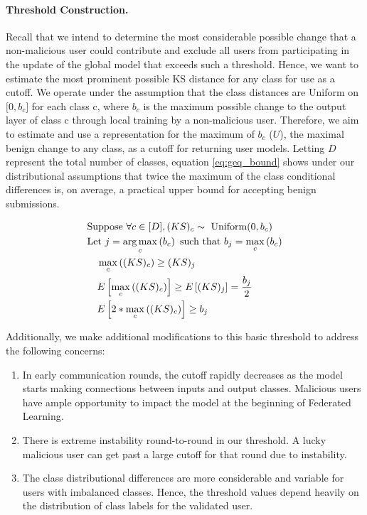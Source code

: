\documentclass{article} %
\begin{document}
\paragraph{Threshold Construction.} Recall that we intend to determine the most considerable possible change that a non-malicious user could contribute and exclude all users from participating in the update of the global model that exceeds such a threshold. Hence, we want to estimate the most prominent possible KS distance for any class for use as a cutoff. We operate under the assumption that the class distances are Uniform on $\mathopen[0, b_c\mathclose]$ for each class c, where $b_c$ is the maximum possible change to the output layer of class c through local training by a non-malicious user. Therefore, we aim to estimate and use a representation for the maximum of $b_c$ ($U$), the maximal benign change to any class, as a cutoff for returning user models. Letting $D$ represent the total number of classes, equation \ref{eq:geq_bound} shows under our distributional assumptions that twice the maximum of the class conditional differences is, on average, a practical upper bound for accepting benign submissions.

\begin{align}
    & \textrm{Suppose } \forall c \in \mathopen[ D \mathclose], (KS)_c \sim \textrm{ Uniform}(0, b_c) \nonumber \\
    & \textrm{Let } j = \operatorname*{arg\,max}_c \left( b_c \right) \textrm{ such that } b_j = \max_c \left( b_c \right) \nonumber \\
    & \quad \max_c \left( (KS)_c \right) \geq (KS)_j \nonumber \\
    & \quad E \left[ \max_c \left( (KS)_c \right) \right] \geq E \left[ (KS)_j \right] = \dfrac{b_j}{2} \nonumber \\
    & \quad E \left[ 2 * \max_c \left( (KS)_c \right) \right] \geq b_j \label{eq:geq_bound} 
\end{align}

Additionally, we make additional modifications to this basic threshold to address the following concerns:
\begin{enumerate}
    \item In early communication rounds, the cutoff rapidly decreases as the model starts making connections between inputs and output classes. Malicious users have ample opportunity to impact the model at the beginning of Federated Learning.
    \item There is extreme instability round-to-round in our threshold. A lucky malicious user can get past a large cutoff for that round due to instability.
    \item The class distributional differences are more considerable and variable for users with imbalanced classes. Hence, the threshold values depend heavily on the distribution of class labels for the validated user.
\end{enumerate}
\end{document}
